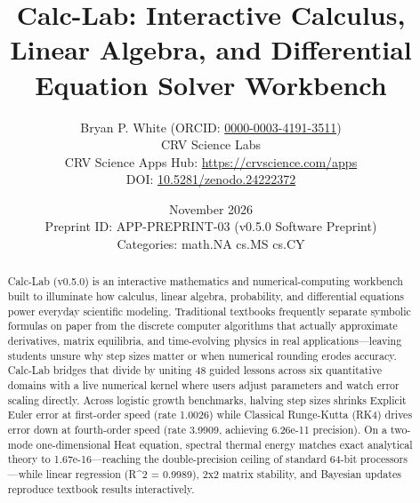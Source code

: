 \documentclass[10pt,letterpaper]{article}
\title{\textbf{Calc-Lab: Interactive Calculus, Linear Algebra, and Differential Equation Solver Workbench}}
\author{Bryan P. White (ORCID: \href{https://orcid.org/0000-0003-4191-3511}{0000-0003-4191-3511}) \\ CRV Science Labs \\ \small CRV Science Apps Hub: \url{https://crvscience.com/apps} \\ \small DOI: \href{https://doi.org/10.5281/zenodo.24222372}{10.5281/zenodo.24222372}}
\date{November 2026 \\ \small Preprint ID: APP-PREPRINT-03 (v0.5.0 Software Preprint) \\ \small Categories: math.NA \textbullet{} cs.MS \textbullet{} cs.CY}
\begin{document}
\maketitle

\begin{abstract}
Calc-Lab (v0.5.0) is an interactive mathematics and numerical-computing workbench built to illuminate how calculus, linear algebra, probability, and differential equations power everyday scientific modeling. Traditional textbooks frequently separate symbolic formulas on paper from the discrete computer algorithms that actually approximate derivatives, matrix equilibria, and time-evolving physics in real applications---leaving students unsure why step sizes matter or when numerical rounding erodes accuracy. Calc-Lab bridges that divide by uniting 48 guided lessons across six quantitative domains with a live numerical kernel where users adjust parameters and watch error scaling directly. Across logistic growth benchmarks, halving step sizes shrinks Explicit Euler error at first-order speed (rate 1.0026) while Classical Runge-Kutta (RK4) drives error down at fourth-order speed (rate 3.9909, achieving 6.26e-11 precision). On a two-mode one-dimensional Heat equation, spectral thermal energy matches exact analytical theory to 1.67e-16---reaching the double-precision ceiling of standard 64-bit processors---while linear regression (R\textasciicircum{}2 = 0.9989), 2x2 matrix stability, and Bayesian updates reproduce textbook results interactively.
\end{abstract}
\end{document}
